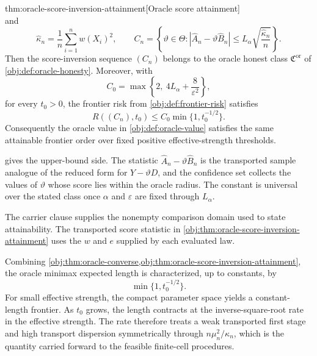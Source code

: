 \begin{theoremv}{thm:oracle-score-inversion-attainment}[Oracle score attainment]
\[\]
and
\[
\widehat\kappa_n=\frac1n\sum_{i=1}^n w(X_i)^2,\qquad
C_n=\left\{\vartheta\in\Theta:
\left|\widehat A_n-\vartheta\widehat B_n\right|
\le L_\alpha\sqrt{\frac{\widehat\kappa_n}{n}}\right\}.
\]
Then the score-inversion sequence \((C_n)\) belongs to the oracle honest class \(\mathfrak C^{\mathrm{or}}\) of \cref{obj:def:oracle-honesty}.  Moreover, with
\[
C_0=\max\left\{2,\ 4L_\alpha+\frac8{\varepsilon^2}\right\},
\]
for every \(t_0>0\), the frontier risk from \cref{obj:def:frontier-risk} satisfies
\[
R((C_n),t_0)\le C_0\min\{1,t_0^{-1/2}\}.
\]
Consequently the oracle value in \cref{obj:def:oracle-value} satisfies the same attainable frontier order over fixed positive effective-strength thresholds.
\end{theoremv}

 gives the upper-bound side.  The statistic \(\widehat A_n-\vartheta\widehat B_n\) is the transported sample analogue of the reduced form for \(Y-\vartheta D\), and the confidence set collects the values of \(\vartheta\) whose score lies within the oracle radius.  The constant  is universal over the stated class once \(\alpha\) and \(\varepsilon\) are fixed through \(L_\alpha\).

The carrier clause supplies the nonempty comparison domain used to state attainability.  The transported score statistic in \cref{obj:thm:oracle-score-inversion-attainment} uses the \(w\) and \(e\) supplied by each evaluated law.

Combining \cref{obj:thm:oracle-converse,obj:thm:oracle-score-inversion-attainment}, the oracle minimax expected length is characterized, up to constants, by
\[
\min\{1,t_0^{-1/2}\}.
\]
For small effective strength, the compact parameter space yields a constant-length frontier.  As \(t_0\) grows, the length contracts at the inverse-square-root rate in the effective strength.  The rate therefore treats a weak transported first stage and high transport dispersion symmetrically through \(n\mu_n^2/\kappa_n\), which is the quantity carried forward to the feasible finite-cell procedures.
